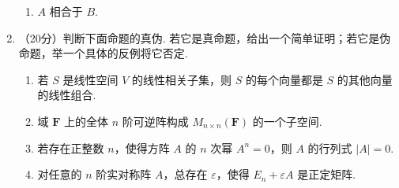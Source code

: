\begin{enumerate}
\begin{enumerate}
        \item $A$ 相合于 $B$.
    \end{enumerate}

\item （20分）判断下面命题的真伪. 若它是真命题，给出一个简单证明；若它是伪命题，举一个具体的反例将它否定.
    \begin{enumerate}
        \item 若 $S$ 是线性空间 $V$ 的线性相关子集，则 $S$ 的每个向量都是 $S$ 的其他向量的线性组合.

        \item 域 $\mathbf{F}$ 上的全体 $n$ 阶可逆阵构成 $M_{n\times n}(\mathbf{F})$ 的一个子空间.

        \item 若存在正整数 $n$，使得方阵 $A$ 的 $n$ 次幂 $A^n=0$，则 $A$ 的行列式 $\lvert A \rvert = 0$.

        \item 对任意的 $n$ 阶实对称阵 $A$，总存在 $\varepsilon$，使得 $E_n+\varepsilon A$ 是正定矩阵.
    \end{enumerate}
\end{enumerate}

\clearpage
